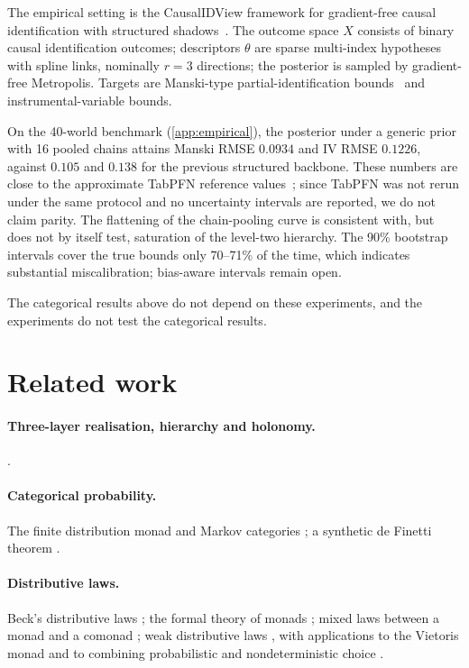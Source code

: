 \documentclass[11pt]{article}
\theoremstyle{definition}
\theoremstyle{remark}
\begin{document}
The empirical setting is the CausalIDView framework for gradient-free causal identification with
structured shadows~\cite{Awasthi-CausalIDView}. The outcome space $X$ consists of binary causal
identification outcomes; descriptors $\theta$ are sparse multi-index hypotheses with spline links,
nominally $r=3$ directions; the posterior is sampled by gradient-free Metropolis. Targets are
Manski-type partial-identification bounds~\cite{Manski1990} and instrumental-variable bounds.

On the 40-world benchmark (\cref{app:empirical}), the posterior under a generic prior with 16 pooled
chains attains Manski RMSE $0.0934$ and IV RMSE $0.1226$, against $0.105$ and $0.138$ for the
previous structured backbone. These numbers are close to the approximate TabPFN reference
values~\cite{Hollmann2023}; since TabPFN was not rerun under the same protocol and no uncertainty
intervals are reported, we do not claim parity. The flattening of the chain-pooling curve is
consistent with, but does not by itself test, saturation of the level-two hierarchy. The 90\%
bootstrap intervals cover the true bounds only 70--71\% of the time, which indicates substantial
miscalibration; bias-aware intervals remain open.

The categorical results above do not depend on these experiments, and the experiments do not test
the categorical results.

\section{Related work}

\paragraph{Three-layer realisation, hierarchy and holonomy.}
\cite{Awasthi-ThreeLayers,Awasthi-Hierarchy,Awasthi-Holonomy}.
\paragraph{Categorical probability.} The finite distribution monad and Markov categories
\cite{Fritz2020,FGPR2023}; a synthetic de Finetti theorem \cite{FGP2021}.
\paragraph{Distributive laws.} Beck's distributive laws \cite{Beck1969}; the formal theory of monads
\cite{Street1972}; mixed laws between a monad and a comonad \cite{PowerWatanabe2002}; weak distributive
laws \cite{Street2009,Bohm2010,BohmLackStreet2011}, with applications to the Vietoris monad
\cite{Garner2020} and to combining probabilistic and nondeterministic choice \cite{GoyPetrisan2020}.
\end{document}
